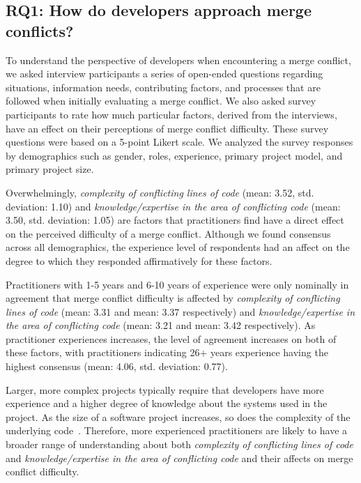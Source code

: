 \subsection{RQ1: How do developers approach merge conflicts?}\label{RQ1}

To understand the perspective of developers when encountering a merge conflict, we asked interview participants a series of open-ended questions regarding situations, information needs, contributing factors, and processes that are followed when initially evaluating a merge conflict.
We also asked survey participants to rate how much particular factors, derived from the interviews, have an effect on their perceptions of merge conflict difficulty.
These survey questions were based on a 5-point Likert scale.
We analyzed the survey responses by demographics such as gender, roles, experience, primary project model, and primary project size.

Overwhelmingly, \textit{complexity of conflicting lines of code} (mean: 3.52, std. deviation: 1.10) and \textit{knowledge/expertise in the area of conflicting code} (mean: 3.50, std. deviation: 1.05) are factors that practitioners find have a direct effect on the perceived difficulty of a merge conflict.
Although we found consensus across all demographics, the experience level of respondents had an affect on the degree to which they responded affirmatively for these factors.

Practitioners with 1-5 years and 6-10 years of experience were only nominally in agreement that merge conflict difficulty is affected by \textit{complexity of conflicting lines of code} (mean: 3.31 and mean: 3.37 respectively) and \textit{knowledge/expertise in the area of conflicting code} (mean: 3.21 and mean: 3.42 respectively).
As practitioner experiences increases, the level of agreement increases on both of these factors, with practitioners indicating 26+ years experience having the highest consensus (mean: 4.06, std. deviation: 0.77). 

Larger, more complex projects typically require that developers have more experience and a higher degree of knowledge about the systems used in the project.
As the size of a software project increases, so does the complexity of the underlying code~\cite{banker1993software}\cite{curtis1979third}.
Therefore, more experienced practitioners are likely to have a broader range of understanding about both \textit{complexity of conflicting lines of code} and \textit{knowledge/expertise in the area of conflicting code} and their affects on merge conflict difficulty.

